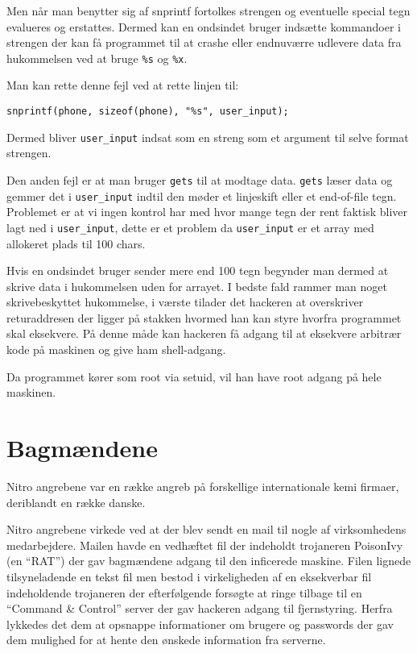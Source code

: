 \documentclass[10pt,a4paper,danish]{article}
\begin{document}
Men når man benytter sig af snprintf fortolkes strengen og eventuelle special
tegn evalueres og erstattes. Dermed kan en ondsindet bruger indsætte kommandoer
i strengen der kan få programmet til at crashe eller endnuværre udlevere data
fra hukommelsen ved at bruge \texttt{\%s} og \texttt{\%x}.

Man kan rette denne fejl ved at rette linjen til:
\begin{verbatim}
snprintf(phone, sizeof(phone), "%s", user_input);
\end{verbatim}
Dermed bliver \texttt{user\_input} indsat som en streng som et argument til
selve format strengen.


Den anden fejl er at man bruger \texttt{gets} til at modtage data.
\texttt{gets} læser data og gemmer det i \texttt{user\_input} indtil den møder et linjeskift eller et end-of-file
tegn.
Problemet er at vi ingen kontrol har med hvor mange tegn der rent faktisk bliver
lagt ned i \texttt{user\_input}, dette er et problem da \texttt{user\_input} er
et array med allokeret plads til 100 chars.

Hvis en ondsindet bruger sender mere end 100 tegn begynder man dermed at skrive
data i hukommelsen uden for arrayet.
I bedste fald rammer man noget skrivebeskyttet hukommelse, i værste tilader det
hackeren at overskriver returaddresen der ligger på stakken hvormed han kan
styre hvorfra programmet skal eksekvere. På denne måde kan hackeren få adgang
til at eksekvere arbitrær kode på maskinen og give ham shell-adgang.

Da programmet kører som root via setuid, vil han have root adgang på hele
maskinen.

\section{Bagmændene}
Nitro angrebene var en række angreb på forskellige internationale kemi firmaer,
deriblandt en række danske.

Nitro angrebene virkede ved at der blev sendt en mail til nogle af virksomhedens
medarbejdere. Mailen havde en vedhæftet fil der indeholdt trojaneren PoisonIvy
(en ``RAT'') der gav bagmændene adgang til
den inficerede maskine. Filen lignede tilsyneladende en tekst fil men bestod i
virkeligheden af en eksekverbar fil indeholdende trojaneren der efterfølgende
forsøgte at ringe tilbage til en ``Command \& Control'' server der gav hackeren
adgang til fjernstyring.
Herfra lykkedes det dem at opsnappe informationer om
brugere og passwords der gav dem mulighed for at hente den ønskede information
fra serverne.
\end{document}
